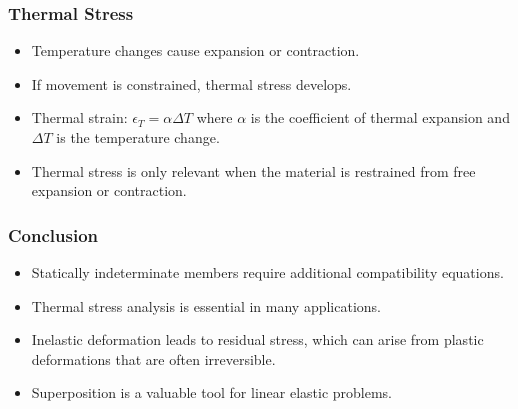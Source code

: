 \documentclass{beamer}
\begin{document}
\begin{frame}
    \frametitle{Thermal Stress}
    \begin{itemize}
        \item Temperature changes cause expansion or contraction.
        \item If movement is constrained, thermal stress develops.
        \item Thermal strain: $\epsilon_T = \alpha \Delta T$ where $\alpha$ is the coefficient of thermal expansion and $\Delta T$ is the temperature change.
        \item Thermal stress is only relevant when the material is restrained from free expansion or contraction.
    \end{itemize}
\end{frame}

\begin{frame}
    \frametitle{Conclusion}
    \begin{itemize}
        \item Statically indeterminate members require additional compatibility equations.
        \item Thermal stress analysis is essential in many applications.
        \item Inelastic deformation leads to residual stress, which can arise from plastic deformations that are often irreversible.
        \item Superposition is a valuable tool for linear elastic problems.
    \end{itemize}
\end{frame}
\end{document}
